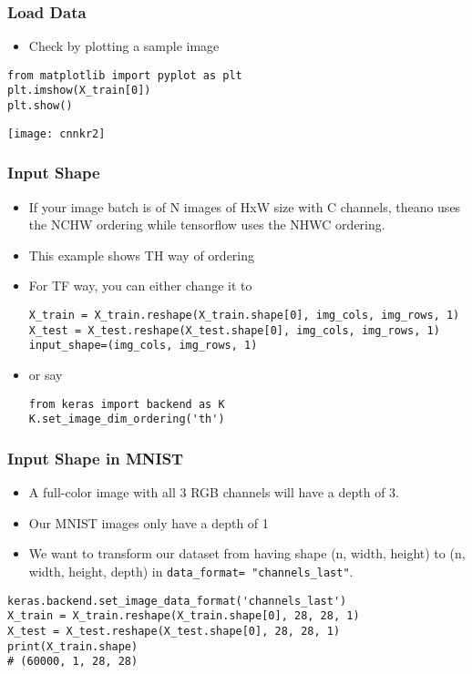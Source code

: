 \begin{frame}[fragile] \frametitle{Load Data}

\begin{itemize}
\item Check by plotting a sample image
\end{itemize}
\begin{lstlisting}
from matplotlib import pyplot as plt
plt.imshow(X_train[0])
plt.show()
\end{lstlisting}
\begin{center}
\texttt{[image: cnnkr2]}
\end{center}
\end{frame}

\begin{frame}[fragile] \frametitle{Input Shape}

\begin{itemize}
\item If your image batch is of N images of HxW size with C channels, theano uses the NCHW ordering while tensorflow uses the NHWC ordering.
\item This example shows TH way of ordering
\item For TF way, you can either change it to 
\begin{lstlisting}
X_train = X_train.reshape(X_train.shape[0], img_cols, img_rows, 1)
X_test = X_test.reshape(X_test.shape[0], img_cols, img_rows, 1)
input_shape=(img_cols, img_rows, 1)
\end{lstlisting}
\item or say
\begin{lstlisting}
from keras import backend as K
K.set_image_dim_ordering('th')
\end{lstlisting}
\end{itemize}
\end{frame}



\begin{frame}[fragile] \frametitle{Input Shape in MNIST}

\begin{itemize}
\item A full-color image with all 3 RGB channels will have a depth of 3.
\item Our MNIST images only have a depth of 1
\item We want to transform our dataset from having shape (n, width, height) to (n, width, height, depth) in \lstinline|data_format= "channels_last"|.
\end{itemize}
\begin{lstlisting}
keras.backend.set_image_data_format('channels_last')
X_train = X_train.reshape(X_train.shape[0], 28, 28, 1)
X_test = X_test.reshape(X_test.shape[0], 28, 28, 1)
print(X_train.shape)
# (60000, 1, 28, 28)
\end{lstlisting}
\end{frame}


